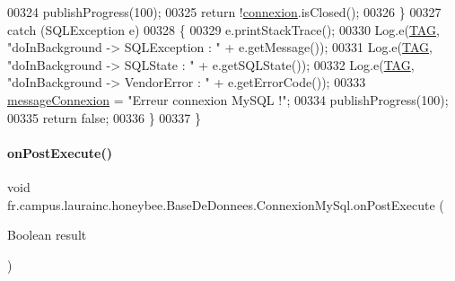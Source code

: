 \begin{DoxyCode}
00324                 publishProgress(100);
00325                 \textcolor{keywordflow}{return} !\hyperlink{classfr_1_1campus_1_1laurainc_1_1honeybee_1_1_base_de_donnees_a358899633f17b8cd00dd2c4cfdd40abe}{connexion}.isClosed();
00326             \}
00327             \textcolor{keywordflow}{catch} (SQLException e)
00328             \{
00329                 e.printStackTrace();
00330                 Log.e(\hyperlink{classfr_1_1campus_1_1laurainc_1_1honeybee_1_1_base_de_donnees_ae800d867b3e423dd139e982736ab5587}{TAG}, \textcolor{stringliteral}{"doInBackground -> SQLException : "} + e.getMessage());
00331                 Log.e(\hyperlink{classfr_1_1campus_1_1laurainc_1_1honeybee_1_1_base_de_donnees_ae800d867b3e423dd139e982736ab5587}{TAG}, \textcolor{stringliteral}{"doInBackground -> SQLState : "} + e.getSQLState());
00332                 Log.e(\hyperlink{classfr_1_1campus_1_1laurainc_1_1honeybee_1_1_base_de_donnees_ae800d867b3e423dd139e982736ab5587}{TAG}, \textcolor{stringliteral}{"doInBackground -> VendorError : "} + e.getErrorCode());
00333                 \hyperlink{classfr_1_1campus_1_1laurainc_1_1honeybee_1_1_base_de_donnees_1_1_connexion_my_sql_a8db83810efa310195fdd72bcbac2843f}{messageConnexion} = \textcolor{stringliteral}{"Erreur connexion MySQL !"};
00334                 publishProgress(100);
00335                 \textcolor{keywordflow}{return} \textcolor{keyword}{false};
00336             \}
00337         \}
\end{DoxyCode}
\mbox{\label{classfr_1_1campus_1_1laurainc_1_1honeybee_1_1_base_de_donnees_1_1_connexion_my_sql_acea6398eed8fc31f2a847f1e4452046c}} 
\paragraph{\texorpdfstring{on\+Post\+Execute()}{onPostExecute()}}
{\footnotesize\ttfamily void fr.\+campus.\+laurainc.\+honeybee.\+Base\+De\+Donnees.\+Connexion\+My\+Sql.\+on\+Post\+Execute (\begin{DoxyParamCaption}\item[{Boolean}]{result }\end{DoxyParamCaption})\hspace{0.3cm}{\ttfamily [protected]}}


